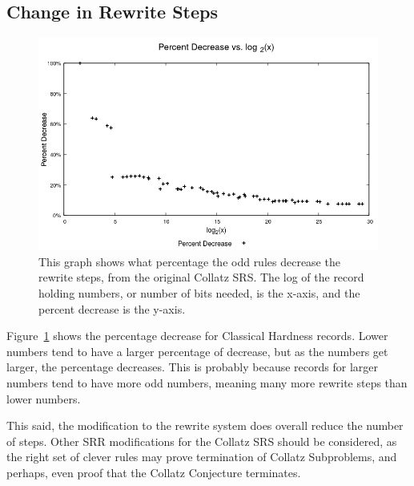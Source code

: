 \subsection{Change in Rewrite Steps}
\begin{figure}
    \centering
    \includegraphics[scale=0.75]{ModAvoidanceAnalysisPics/Percent_Decrease.png}
    \caption{This graph shows what percentage the odd rules decrease the rewrite steps, from the original Collatz SRS. The log of the record holding numbers, or number of bits needed, is the x-axis, and the percent decrease is the y-axis.}
    \label{fig:percent_decrease}
\end{figure}
Figure~\ref{fig:percent_decrease} shows the percentage decrease for Classical Hardness records. Lower numbers tend to have a larger percentage of decrease, but as the numbers get larger, the percentage decreases. This is probably because records for larger numbers tend to have more odd numbers, meaning many more rewrite steps than lower numbers. \par
This said, the modification to the rewrite system does overall reduce the number of steps. Other SRR modifications for the Collatz SRS should be considered, as the right set of clever rules may prove termination of Collatz Subproblems, and perhaps, even proof that the Collatz Conjecture terminates.
